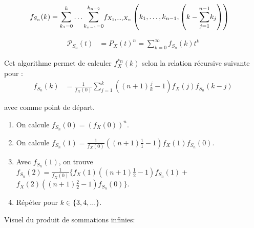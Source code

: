 \documentclass[10pt, french]{article}
\begin{document}
\begin{multicols*}{2}
\begin{align*}
	f_{S_{n}}(k)
	&=	\sumz{k}{k_{1}	=	0}\dots\sumz{k_{n	-	2}}{k_{n	-	1}	=	0} 
	f_{X_{1}, \dots, X_{n}}\left(k_{1}, \dots, k_{n - 1}, \left(k - \sumz{n	-	1}{j	=	1}k_{j} \right) \right)
\end{align*}

\begin{align*}
	\mathcal{P}_{S_{n}}(t)
	&=	P_{X}(t)^{n}	
	=	\sum_{k = 0}^{\infty} f_{S_{n}}(k) t^{k}
\end{align*}

\begin{algo2}
Cet algorithme permet de calculer $f_{X}^{\ast n}(k)$ selon la relation récursive suivante pour  :
\begin{align*}
	f_{S_{n}}(k)
	&=	\frac{1}{f_{X}(0)} \sum_{j = 1}^{k} \left((n + 1)\frac{j}{k} - 1\right)f_{X}(j)f_{S_{n}}(k - j)
\end{align*}

avec  comme point de départ.

\tcbline

\begin{enumerate}
	\item	On calcule $f_{S_{n}}(0)	=	\left(f_{X}(0)\right)^{n}$.
	\item	On calcule $f_{S_{n}}(1)	=	\frac{1}{f_{X}(0)} \left((n + 1)\frac{1}{1} - 1\right)f_{X}(1)f_{S_{n}}(0)$.
	\item	Avec $f_{S_{n}}(1)$, on trouve $f_{S_{n}}(2)	=	\frac{1}{f_{X}(0)} \bigg\{ f_{X}(1)\left((n + 1)\frac{1}{2} - 1\right)f_{S_{n}}(1)	+$ $ f_{X}(2)\left((n + 1)\frac{2}{2} - 1\right)f_{S_{n}}(0) \bigg\}$.
	\item	Répéter pour $k \in \{3, 4, \dots\}$.
\end{enumerate}
\end{algo2}

Visuel du produit de sommations infinies: 
\begin{center}



\begin{tikzpicture}[x=0.75pt,y=0.75pt,yscale=-1,xscale=1]


\end{tikzpicture}
\end{center}
\end{multicols*}
\end{document}
